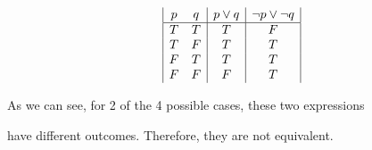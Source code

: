 \documentclass[10pt]{article}
\begin{document}
\begin{displaymath}
\begin{array}{|c c|c|c|}
p & q & p \lor q & \neg p \lor \neg q\\
\hline
T & T & T & F\\
T & F & T & T\\
F & T & T & T\\
F & F & F & T\\
\end{array}
\end{displaymath}

As we can see, for 2 of the 4 possible cases, these two expressions 

have different outcomes. Therefore, they are not equivalent.



\end{document}
